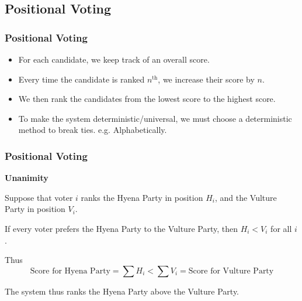 \documentclass{beamer}
\newcommand{\heading}[1]{{\Large\bfseries #1}\vspace{1em}}
\begin{document}
    \subsection{Positional Voting}
    \begin{frame}
        \frametitle{Positional Voting}
    
        \begin{itemize}
            \item For each candidate, we keep track of an overall score. \pause
            \item Every time the candidate is ranked $n^\text{th}$, we increase their score by $n$. \pause
            \item We then rank the candidates from the lowest score to the highest score. \pause
            \item To make the system deterministic/universal, we must choose a deterministic method to break ties. e.g. Alphabetically.
        \end{itemize}
    
    \end{frame}
    \begin{frame}
        \frametitle{Positional Voting}
    
        \heading{Unanimity}

        Suppose that voter $i$ ranks the Hyena Party in position $H_i$, and the Vulture Party in position $V_i$. \pause

        If every voter prefers the Hyena Party to the Vulture Party, then $H_i < V_i$ for all $i$. \pause

        Thus
        \[
            \text{Score for Hyena Party} = \sum H_i < \sum V_i = \text{Score for Vulture Party}
        \] \pause
    
        The system thus ranks the Hyena Party above the Vulture Party.
    \end{frame}
\end{document}
